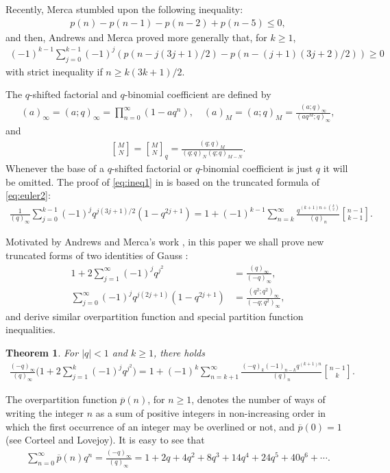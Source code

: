 \documentclass[12pt]{article}
\newtheorem{thm}{Theorem}[section]
\theoremstyle{remark}
\numberwithin{equation}{section}
\begin{document}
Recently, Merca \cite{Merca} stumbled upon the following inequality:
\begin{align}
p(n)-p(n-1)-p(n-2)+p(n-5)\leqslant 0, \label{eq:merca}
\end{align}
and then,
Andrews and Merca \cite{AM} proved more generally  that, for $k\geqslant 1$,
\begin{align}
(-1)^{k-1}\sum_{j=0}^{k-1} (-1)^{j}(p(n-j(3j+1)/2)-p(n-(j+1)(3j+2)/2))\geqslant 0 \label{eq:ineq1}
\end{align}
with strict inequality if $n\geqslant k(3k+1)/2$.



The $q$-shifted factorial and $q$-binomial coefficient  are defined by
\begin{align*}
(a)_\infty=(a;q)_\infty=\prod_{n=0}^{\infty}(1-aq^n),
\quad (a)_M=(a;q)_M=\frac{(a;q)_\infty}{(aq^M;q)_\infty},
\end{align*}
and
\begin{align*}
{M\brack N}={M\brack N}_q=\frac{(q;q)_M}{(q;q)_N (q;q)_{M-N}}.
\end{align*}
Whenever the base of a $q$-shifted factorial or $q$-binomial
coefficient is just $q$ it will be omitted.
The proof of \eqref{eq:ineq1} in \cite{AM} is based on the truncated formula of \eqref{eq:euler2}:
\begin{align*}
\frac{1}{(q)_\infty}\sum_{j=0}^{k-1} (-1)^j q^{j(3j+1)/2}(1-q^{2j+1})
=1+(-1)^{k-1} \sum_{n=k}^\infty
\frac{q^{(k+1)n+{k\choose 2}}}{(q)_n}{n-1\brack k-1}.
\end{align*}

Motivated by Andrews and Merca's work \cite{AM}, in this paper we shall prove
new truncated forms of two identities of Gauss \cite[p.~23]{Andrews98}:
\begin{align*}
1+2\sum_{j=1}^{\infty} (-1)^j q^{j^2}
&=\frac{(q)_\infty}{(-q)_\infty},  \\  %
\sum_{j=0}^\infty (-1)^jq^{j(2j+1)}(1-q^{2j+1})
&=\frac{(q^2;q^2)_\infty}{(-q;q^2)_\infty}, %
\end{align*}
and  derive similar overpartition function and special partition function inequalities.
\begin{thm}\label{thm:1}
For $|q|<1$ and $k\geqslant 1$, there holds
\begin{align}
\frac{(-q)_\infty}{(q)_\infty}\bigg(1+2\sum_{j=1}^k (-1)^j q^{j^2}\bigg)
=1+(-1)^k \sum_{n=k+1}^\infty \frac{(-q)_{k} (-1)_{n-k}q^{(k+1)n}}{(q)_n}{n-1\brack k}. \label{eq:genovp}
\end{align}
\end{thm}
The overpartition function $\overline{p}(n)$, for $n\geqslant 1$, denotes the number of ways of writing the integer $n$ as a sum of
positive integers in non-increasing order in which the first occurrence of an integer may be
overlined or not, and $\overline{p}(0)=1$
(see Corteel and Lovejoy\cite{CL}).  It is easy to see that
\begin{align}
\sum_{n=0}^{\infty}\overline{p}(n) q^n
=\frac{(-q)_\infty}{(q)_\infty}
=1+2q+4q^2+8q^3+14q^4+24q^5+40q^6+\cdots. \label{eq:ovp}
\end{align}
\end{document}
